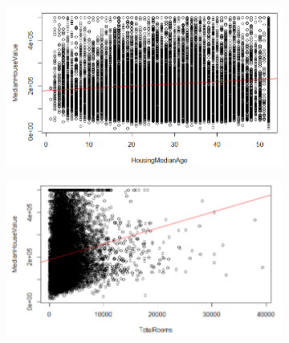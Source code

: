 \begin{figure}[!tbh]
	\begin{subfigure}{0.5\textwidth}
	\includegraphics[width=1\linewidth]{figures/regre_3}
\caption{}
\label{fig:regre3}
	\end{subfigure}\hfil %
	\begin{subfigure}{0.5\textwidth}
	\includegraphics[width=1\linewidth]{figures/regre_4}
\caption{}
\label{fig:regre4}
	\end{subfigure}\hfil %
	
	\medskip
	

\end{figure}
